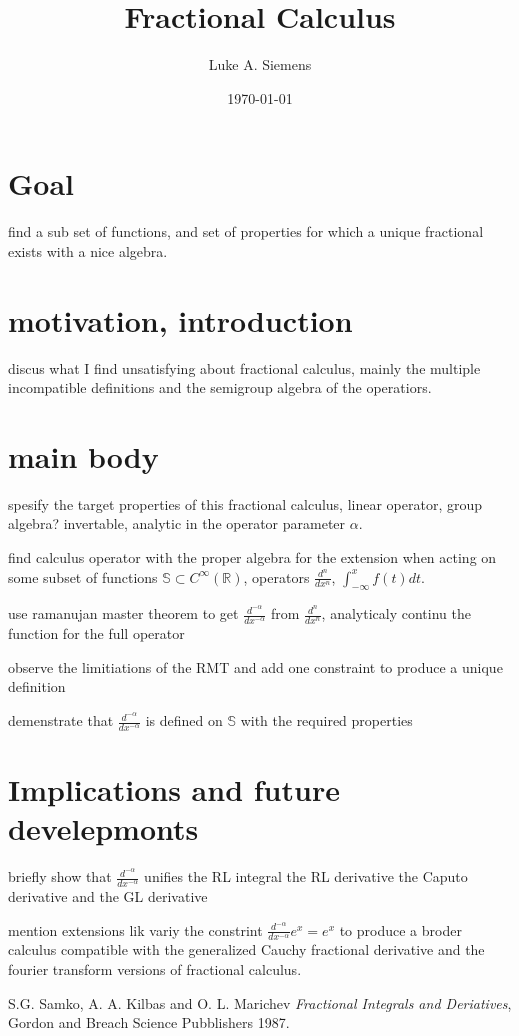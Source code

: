 \documentclass[%
 preprint,
 amsmath, amssymb, aps, pra, 10pt
]{revtex4-2}
\begin{document}
\title{Fractional Calculus}%

\author{Luke A. Siemens}
\noaffiliation

\date{\today}

\maketitle

\section{Goal}
find a sub set of functions, and set of properties for which a unique fractional exists with a nice algebra.

\section{motivation, introduction}
discus what I find unsatisfying about fractional calculus, mainly  the multiple incompatible definitions and the semigroup algebra of the operatiors.

\section{main body}
spesify the target properties of this fractional calculus, linear operator, group algebra? invertable, analytic in the operator parameter $\alpha$.

find calculus operator with the proper algebra for the extension when acting on some subset of functions $\mathbb{S} \subset C^{\infty}(\mathbb{R})$, operators $\frac{d^n}{dx^n}$, $\int_{-\infty}^x f(t)dt$.

use ramanujan master theorem to get $\frac{d^{-\alpha}}{dx^{-\alpha}}$ from $\frac{d^n}{dx^n}$, analyticaly continu the function for the full operator

observe the limitiations of the RMT and add one constraint to produce a unique definition

demenstrate that $\frac{d^{-\alpha}}{dx^{-\alpha}}$ is defined on $\mathbb{S}$ with the required properties

\section{Implications and future develepmonts}
briefly show that $\frac{d^{-\alpha}}{dx^{-\alpha}}$ unifies the RL integral the RL derivative the Caputo derivative and the GL derivative

mention extensions lik variy  the constrint $\frac{d^{-\alpha}}{dx^{-\alpha}}e^x = e^x$ to produce a broder calculus compatible with the generalized Cauchy fractional derivative and the fourier transform versions of fractional calculus. 

\begin{thebibliography}{1}

  S.G. Samko, A. A. Kilbas and O. L. Marichev
  \textit{Fractional Integrals and Deriatives},
  Gordon and Breach Science Pubblishers
  1987.

\end{thebibliography}
\end{document}
